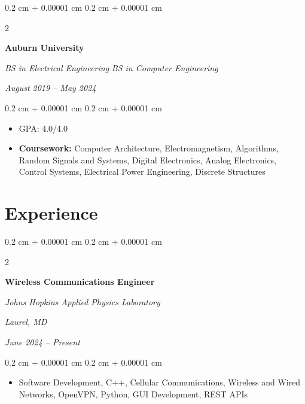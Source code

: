 \documentclass[10pt, letterpaper]{article}
\newenvironment{highlights}{
    \begin{itemize}[
        topsep=0.10 cm,
        parsep=0.10 cm,
        partopsep=0pt,
        itemsep=0pt,
        leftmargin=0.4 cm + 10pt
    ]
}{
    \end{itemize}
} %
\newenvironment{onecolentry}{
    \begin{adjustwidth}{
        0.2 cm + 0.00001 cm
    }{
        0.2 cm + 0.00001 cm
    }
}{
    \end{adjustwidth}
} %
\newenvironment{twocolentry}[2][]{
    \onecolentry
    \def\secondColumn{#2}
    \setcolumnwidth{\fill, 4.5 cm}
    \begin{paracol}{2}
}{
    \switchcolumn \raggedleft \secondColumn
    \end{paracol}
    \endonecolentry
} %
\let\hrefWithoutArrow\href
\renewcommand{\href}[2]{\hrefWithoutArrow{#1}{\ifthenelse{\equal{#2}{}}{ }{#2 }\raisebox{.15ex}{\footnotesize \faExternalLink*}}}
\begin{document}
        \vspace{0.2 cm}

        \begin{twocolentry}{
        \textit{August 2019 – May 2024}}
            \textbf{Auburn University}

            \textit{BS in Electrical Engineering}
            \newline
            \textit{BS in Computer Engineering}
        \end{twocolentry}

        \vspace{0.10 cm}
        \begin{onecolentry}
            \begin{highlights}
                \item GPA: 4.0/4.0 %
                \item \textbf{Coursework:} Computer Architecture, Electromagnetism, Algorithms, Random Signals and Systems, Digital Electronics, Analog Electronics, Control Systems, Electrical Power Engineering, Discrete Structures
            \end{highlights}
        \end{onecolentry}








    \section{Experience}



        
        \begin{twocolentry}{
        \textit{Laurel, MD}    
            
        \textit{June 2024 – Present}}
            \textbf{Wireless Communications Engineer}
            
            \textit{Johns Hopkins Applied Physics Laboratory}
        \end{twocolentry}

        \vspace{0.10 cm}
        \begin{onecolentry}
            \begin{highlights}
                \item Software Development, C++, Cellular Communications, Wireless and Wired Networks, OpenVPN, Python, GUI Development, REST APIs
            \end{highlights}
        \end{onecolentry}
\end{document}
